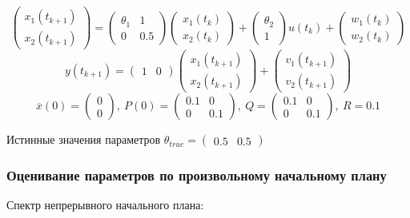 \documentclass[a4paper,14pt]{extarticle}
\newcommand{\fut}[0]{t_{k+1}}
\begin{document}
\[
  \begin{pmatrix} x_1(\fut) \\ x_2(\fut) \end{pmatrix} =
  \begin{pmatrix} \theta_1 & 1 \\ 0 & 0.5 \end{pmatrix}
  \begin{pmatrix} x_1(t_k) \\ x_2(t_k) \end{pmatrix}
  + 
	\begin{pmatrix} \theta_2 \\ 1 \end{pmatrix}
	u(t_k) 
  + \begin{pmatrix} w_1(t_k) \\ w_2(t_k) \end{pmatrix}
\]
\[
  y(\fut) =
	\begin{pmatrix} 1 & 0 \end{pmatrix}
	\begin{pmatrix} x_1(\fut) \\ x_2(\fut) \end{pmatrix} +
  \begin{pmatrix} v_1(\fut) \\ v_2(\fut) \end{pmatrix}
\]
\[
  \overline{x}(0) = \begin{pmatrix} 0 \\ 0 \end{pmatrix},\
  P(0) = \begin{pmatrix} 0.1 & 0 \\ 0 & 0.1 \end{pmatrix},\
  Q = \begin{pmatrix} 0.1 & 0 \\ 0 & 0.1 \end{pmatrix},\
  R = 0.1 
\]

Истинные значения параметров
$\theta_{true} = \begin{pmatrix} 0.5 & 0.5 \end{pmatrix}$ \\

\newpage
\subsubsection{Оценивание параметров по произвольному начальному плану}

Спектр непрерывного начального плана:
\end{document}
